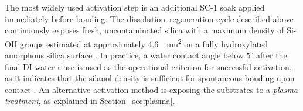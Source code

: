 The most widely used activation step is an additional SC-1 
soak applied immediately before bonding.
The dissolution--regeneration 
cycle described above continuously exposes fresh, uncontaminated silica 
with a maximum density of Si-OH groups estimated at approximately 
\SI{4.6}{\per\nano\meter\squared} on a fully hydroxylated amorphous 
silica surface \cite{zhuravlev2000}. In practice, a water contact angle 
below $5^\circ$ after the final DI water rinse is used as the 
operational criterion for successful activation, as it indicates that 
the silanol density is sufficient for spontaneous bonding upon contact 
\cite{gosele2006,possl1999}. An alternative activation method is
exposing the substrates to a \textit{plasma treatment}, as explained in Section~\ref{sec:plasma}. 